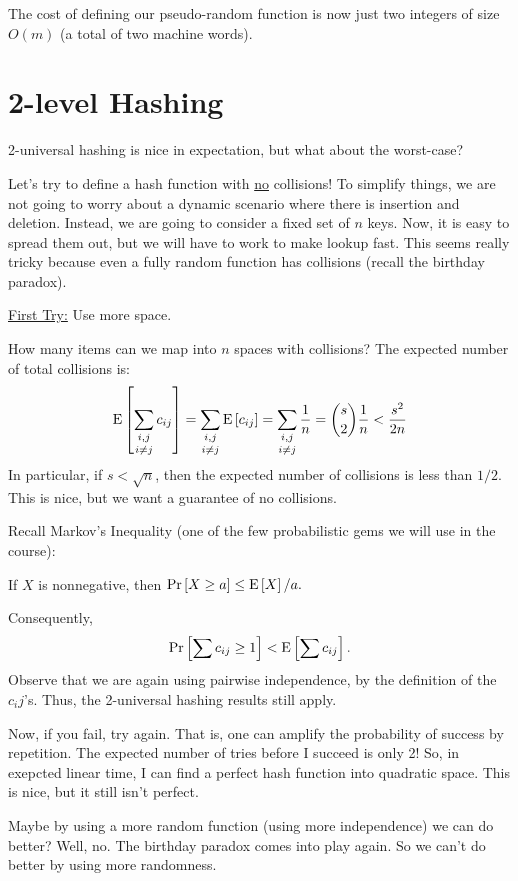 \documentclass{article}
\renewcommand{\Pr}[1]{\textnormal{Pr}\left[ #1 \right]}
\newcommand{\E}[1]{\textnormal{E}\left[ #1 \right]}
\begin{document}
The cost of defining our pseudo-random function is now just two integers of size $O(m)$ (a total of two machine words).

\section{2-level Hashing}

2-universal hashing is nice in expectation, but what about the worst-case?

Let's try to define a hash function with \underline{no} collisions!  To simplify things, we are not going to worry about a dynamic scenario where there is insertion and deletion.  Instead, we are going to consider a fixed set of $n$ keys.  Now, it is easy to spread them out, but we will have to work to make lookup fast.  This seems really tricky because even a fully random function has collisions (recall the birthday paradox).

\underline{First Try:} Use more space.

How many items can we map into $n$ spaces with collisions?  The expected number of total collisions is:
$$\E{\mathop{\sum_{i,j}}_{i\not=j} c_{ij}} = \mathop{\sum_{i,j}}_{i\not=j}\E{c_{ij}} = \mathop{\sum_{i,j}}_{i\not=j} {1 \over n} = {s \choose 2}{1 \over n} < {s^2 \over 2n}$$
In particular, if $s < \sqrt{n}$, then the expected number of collisions is less than $1/2$. This is nice, but we want a guarantee of no collisions.

Recall Markov's Inequality (one of the few probabilistic gems we will use in the course):
\begin{lemma}
If $X$ is nonnegative, then
$\Pr{X \geq a} \leq \E{X}/a.$
\end{lemma}

Consequently, $$\Pr{\sum c_{ij} \geq 1} < \E{\sum c_{ij}}.$$
Observe that we are again using pairwise independence, by the definition of the $c_ij$'s.  Thus, the 2-universal hashing results still apply.

Now, if you fail, try again.  That is, one can amplify the probability of
success by repetition.  The expected number of tries before I succeed is
only 2!  So, in exepcted linear time, I can find a perfect hash function into
quadratic space.  This is nice, but it still isn't perfect.

Maybe by using a more random function (using more independence) we can do better?  Well, no.  The birthday paradox comes into play again.  So we can't do better by using more randomness.
\end{document}
